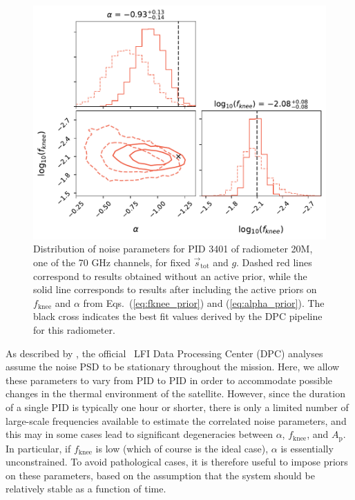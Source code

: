\documentclass{aa}
\begin{document}
\begin{figure}
  \begin{center}
    \includegraphics[width=\linewidth]{figs/constraining_power_corner_small_new.pdf}
  \end{center}
  \caption{Distribution of noise parameters for PID 3401 of
    radiometer 20M, one of the 70 GHz channels, for fixed
    $\vec{s}_\mathrm{tot}$ and $g$. Dashed red lines correspond to
    results obtained without an active prior, while the solid line
    corresponds to results after including the active priors on
    $f_\mathrm{knee}$ and $\alpha$ from Eqs.~(\ref{eq:fknee_prior}) and
    (\ref{eq:alpha_prior}). The black cross indicates the best fit values
    derived by the DPC pipeline for this radiometer.
    \label{fig:conditional}}
\end{figure}

As described by \citet{planck2016-l02}, the official \Planck\ LFI Data 
Processing Center (DPC)
analyses assume the noise PSD to be stationary throughout the
mission. Here, we allow these parameters to
vary from PID to PID in order to accommodate possible changes in the
thermal environment of the satellite. However, since the duration of a
single PID is typically one hour or shorter, there is only a limited
number of large-scale frequencies available to estimate the correlated
noise parameters, and this may in some cases lead to significant
degeneracies between $\alpha$, $f_\mathrm{knee}$, and 
$A_\mathrm{p}$. In particular, if
$f_\mathrm{knee}$ is low (which of course is the ideal case), $\alpha$
is essentially unconstrained. To avoid pathological cases, it is
therefore useful to impose priors on these parameters, based on
the assumption that the system should be relatively stable as a
function of time.
\end{document}
